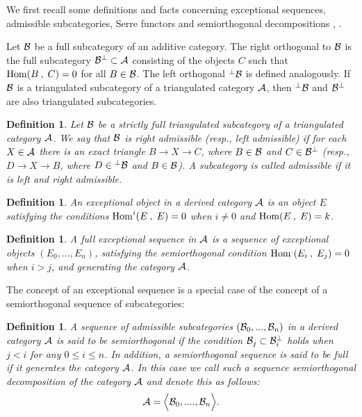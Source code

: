 \documentclass[12pt]{article}
\newtheorem{definition}[theorem]{Definition}
\def\h#1,#2{{\rm Hom}({#1}\:,\; {#2})}
\begin{document}
We first recall some definitions and facts concerning exceptional sequences, admissible subcategories, Serre functors and semiorthogonal decompositions \cite{Bon}, \cite{BK}.

Let ${\cal B}$ be a full subcategory of an additive category. The {\sf right orthogonal} to ${\cal B}$ is the full subcategory ${\cal B}^{\perp}\subset {\cal A}$ consisting of the objects $C$ such that ${\h B, C}=0$
for all $B\in{\cal B}$. The {\sf left orthogonal} ${}^{\perp}{\cal B}$ is defined analogously. If ${\cal B}$ is a triangulated subcategory of a triangulated category ${\cal A}$, then ${}^{\perp}{\cal B}$ and ${\cal B}^{\perp}$ are also triangulated subcategories.
\begin{definition}\label{adm}
Let ${\cal B}$ be a strictly full triangulated subcategory of  a triangulated category ${\cal A}$. We say that ${\cal B}$ is {\sf right admissible} (resp., {\sf left admissible}) if for each $X\in{\cal A}$ there is an exact triangle $B\to X\to C$, where $B\in{\cal B}$ and $C\in{\cal B}^{\perp}$ (resp., $D\to X\to B$, where $D\in{}^{\perp}{\cal B}$ and $B\in{\cal B}$). A subcategory is called {\sf admissible} if it is left and right  admissible.
\end{definition}

\begin{definition}\label{exc}
An {\sf exceptional object} in a derived category ${\cal A}$ is an object $E$ satisfying the conditions ${\rm Hom}^i(E\:,\;E)=0$ when $i\ne0$ and ${\rm Hom}(E\:,\;E)=k$.
\end{definition}
\begin{definition}\label{exs}
{\sf A full exceptional sequence} in ${\cal A}$ is a
sequence of exceptional objects $(E_0,..., E_n)$, satisfying the semiorthogonal condition ${\rm Hom}^.(E_i\:,\;E_j)=0$ when $i>j$, and generating the category ${\cal A}$.
\end{definition}

The concept of an exceptional sequence is a special case of the concept of a semiorthogonal sequence of subcategories:

\begin{definition}\label{sd}
A sequence of admissible subcategories $({\cal B}_0,..., {\cal B}_n)$ in a derived category ${\cal A}$ is said to be {\sf semiorthogonal} if the condition ${\cal B}_j\subset {\cal B}^{\perp}_i$ holds when $j<i$ for any $0\le i\le n$. In addition, a semiorthogonal sequence is said to be {\sf full} if it generates the category ${\cal A}$. In this case we call such a sequence {\sf semiorthogonal decomposition} of the category ${\cal A}$ and denote this as follows:
$$
{\cal A}=\Bigl\langle{\cal B}_0,....,{\cal B}_n\Bigl\rangle.
$$
\end{definition}
\end{document}
